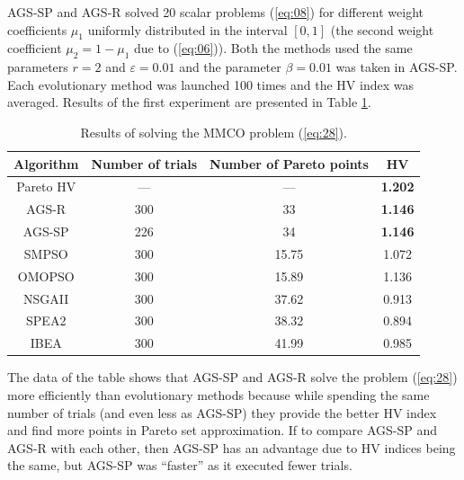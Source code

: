 \documentclass[runningheads]{llncs}
\begin{document}
AGS-SP and AGS-R solved 20 scalar problems (\ref{eq:08}) for different weight coefficients $\mu_1$ uniformly distributed in the interval $[0,1]$ (the second weight coefficient $\mu_2=1-\mu_1$ due to (\ref{eq:06})). Both the methods used the same parameters $r=2$ and $\varepsilon=0.01$ and the parameter $\beta=0.01$ was taken in AGS-SP. Each evolutionary method was launched 100 times and the HV index was averaged.
Results of the first experiment are presented in Table \ref{tab:01}.

\begin{table}[ht]
\caption{Results of solving the MMCO problem (\ref{eq:28}).}
\label{tab:01}
\center
\begin{tabular}{|c|c|c|c|}
\hline
\textbf{Algorithm} & \textbf{Number of trials} & \textbf{Number of Pareto points} & \textbf{HV}    \\ \hline
Pareto HV          & ---                       & ---                              & \textbf{1.202} \\
AGS-R              & 300                       & 33                               & \textbf{1.146} \\
AGS-SP             & 226                       & 34                               & \textbf{1.146} \\
SMPSO              & 300                       & 15.75                            & 1.072          \\
OMOPSO             & 300                       & 15.89                            & 1.136          \\
NSGAII             & 300                       & 37.62                            & 0.913          \\
SPEA2              & 300                       & 38.32                            & 0.894          \\
IBEA               & 300                       & 41.99                            & 0.985          \\ \hline
\end{tabular}
\end{table}

The data of the table shows that AGS-SP and AGS-R solve the problem (\ref{eq:28}) more efficiently than evolutionary methods because while spending the same number of trials (and even less as AGS-SP) they provide the  better HV index and find more points in Pareto set approximation. If to compare AGS-SP and AGS-R with each other, then AGS-SP has an advantage due to HV indices being the same, but AGS-SP was ``faster'' as it executed fewer trials.
\end{document}
